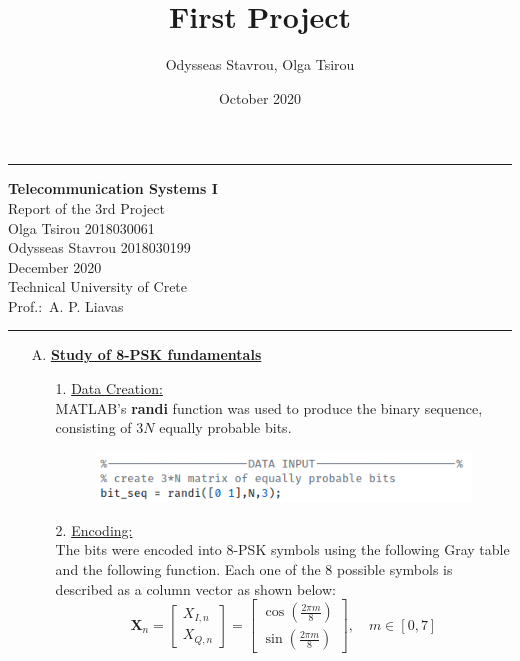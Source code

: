 \documentclass[12pt, a4paper]{article}
\title{First Project}
\author{Odysseas Stavrou, Olga Tsirou}
\date{October 2020}
\begin{document}
\noindent\rule{\textwidth}{1.5pt}

\begin{center}
    {\bf Telecommunication Systems I} \\ 
    Report of the 3rd Project\\
    Olga Tsirou 2018030061\\
    Odysseas Stavrou 2018030199\\
    December 2020\\
    Technical University of Crete\\
    Prof.:\ A. P. Liavas 
\end{center}
\noindent\rule{\textwidth}{1.5pt}

\begin{enumerate}
    \item[A.] \textbf{\underline{Study of 8-PSK fundamentals}}
    \begin{enumerate}
        \item[1.] \underline{Data Creation:}\\
        MATLAB's \textbf{randi} function was used to produce the binary sequence, 
        consisting of \(3N\) equally probable bits. 
        \begin{figure}[H]
            \centering
            \includegraphics[scale=0.9]{bit_cre.png}
        \end{figure}
        \item[2.] \underline{Encoding:}\\
        The bits were encoded into 8-PSK symbols using the following Gray table
        and the following function. Each one of the 8 possible symbols is described 
        as a column vector as shown below:
            \[\textbf{X}_n = 
            \begin{bmatrix}
                X_{I,n}\\
                X_{Q,n}
            \end{bmatrix}
            =\begin{bmatrix}
                \cos(\frac{2\pi m}{8})\\
                \sin(\frac{2\pi m}{8})
            \end{bmatrix}, \quad m \in [0,7]\]


\end{enumerate}
\end{enumerate}
\end{document}
